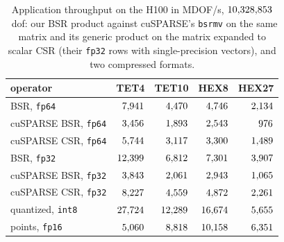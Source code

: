 \documentclass[sigconf,review]{acmart}
\begin{document}
\begin{table}[t]
\centering
\footnotesize
\setlength{\tabcolsep}{2.5pt}
\begin{tabular}{lrrrr}
\toprule
operator & TET4 & TET10 & HEX8 & HEX27 \\
\midrule
BSR, \texttt{fp64} & $7{,}941$ & $4{,}470$ & $4{,}746$ & $2{,}134$ \\
cuSPARSE BSR, \texttt{fp64} & $3{,}456$ & $1{,}893$ & $2{,}543$ & $976$ \\
cuSPARSE CSR, \texttt{fp64} & $5{,}744$ & $3{,}117$ & $3{,}300$ & $1{,}489$ \\
BSR, \texttt{fp32} & $12{,}399$ & $6{,}812$ & $7{,}301$ & $3{,}907$ \\
cuSPARSE BSR, \texttt{fp32} & $3{,}843$ & $2{,}061$ & $2{,}943$ & $1{,}065$ \\
cuSPARSE CSR, \texttt{fp32} & $8{,}227$ & $4{,}559$ & $4{,}872$ & $2{,}261$ \\
quantized, \texttt{int8} & $27{,}724$ & $12{,}289$ & $16{,}674$ & $5{,}655$ \\
points, \texttt{fp16} & $5{,}060$ & $8{,}818$ & $10{,}158$ & $6{,}351$ \\
\bottomrule
\end{tabular}
\caption{Application throughput on the H100 in MDOF/s, $10{,}328{,}853$~dof: our BSR
product against cuSPARSE's \texttt{bsrmv} on the same matrix and its generic product on the matrix
expanded to scalar CSR (their \texttt{fp32} rows with single-precision vectors), and two compressed
formats.}
\label{tab:gpu}
\end{table}
\end{document}
